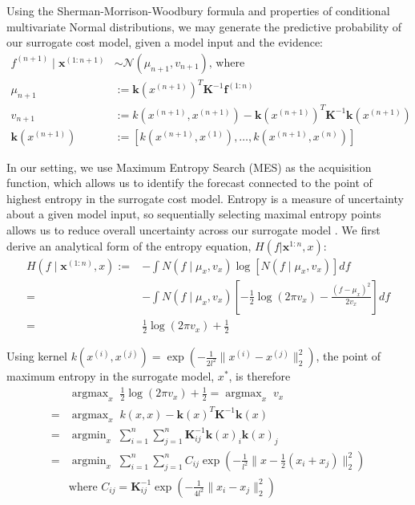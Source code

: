 \documentclass[10pt,twocolumn,letterpaper]{article}
\begin{document}
Using the Sherman-Morrison-Woodbury formula and properties of conditional multivariate Normal distributions, we may generate the predictive probability of our surrogate cost model, given a model input and the evidence:
\begin{align*}
    f^{(n+1)} \mid \textbf{x}^{(1:n+1)} &\sim \mathcal{N}(\mu_{n+1}, v_{n+1}) \textrm{, where}\\
    \mu_{n+1} &:= \textbf{k}(x^{(n+1)})^T\textbf{K}^{-1}\textbf{f}^{(1:n)}\\
    v_{n+1} &:= k(x^{(n+1)}, x^{(n+1)}) - \textbf{k}(x^{(n+1)})^T\textbf{K}^{-1}\textbf{k}(x^{(n+1)})\\
    \textbf{k}(x^{(n+1)}) &:= \left[k(x^{(n+1)}, x^{(1)}), \dots, k(x^{(n+1)}, x^{(n)})\right]
\end{align*}

In our setting, we use Maximum Entropy Search (MES) as the acquisition function, which allows us to identify the forecast connected to the point of highest entropy in the surrogate cost model. Entropy is a measure of uncertainty about a given model input, so sequentially selecting maximal entropy points allows us to reduce overall uncertainty across our surrogate model \cite{sebastiani_mes}\cite{mussmann2018relationship}. We first derive an analytical form of the entropy equation, $H(f | \textbf{x}^{1:n}, x)$:
\begin{align*}
    H(f \mid \textbf{x}^{(1:n)}, x) :=& -\int N(f \mid \mu_x, v_x) \log\left[N(f \mid \mu_x, v_x)\right]df\\
    =& -\int N(f \mid \mu_x, v_x) \left[-\frac{1}{2}\log(2\pi v_x) - \frac{(f - \mu_x)^2}{2v_x}\right]df\\
    =& \frac{1}{2}\log(2\pi v_x) + \frac{1}{2}
\end{align*}

Using kernel $k(x^{(i)}, x^{(j)}) = \exp\left(-\frac{1}{2l^2}\lVert x^{(i)} - x^{(j)}\rVert^2_2\right)$, the point of maximum entropy in the surrogate model, $x^*$, is therefore
\begin{align*}
    &\; \textrm{argmax}_x \;\; \frac{1}{2}\log(2\pi v_x) + \frac{1}{2} = \; \textrm{argmax}_x \;\; v_x \\
    =&\; \textrm{argmax}_x \;\; k(x, x) - \textbf{k}(x)^T\textbf{K}^{-1}\textbf{k}(x)\\
    =&\; \textrm{argmin}_x \;\; \sum_{i=1}^n\sum_{j=1}^n \textbf{K}^{-1}_{ij} \textbf{k}(x)_i \textbf{k}(x)_j\\
    =&\; \textrm{argmin}_x \;\; \sum_{i=1}^n\sum_{j=1}^n C_{ij} \exp\left(-\frac{1}{l^2}\lVert x - \frac{1}{2}(x_i + x_j)\rVert _2^2\right)\\
    &\textrm{where } C_{ij} = \textbf{K}^{-1}_{ij}\exp(-\frac{1}{4l^2}\lVert x_i - x_j\rVert^2_2)
\end{align*}
\end{document}
